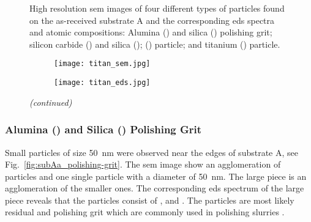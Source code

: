 \begin{figure}
\begin{subfigure}[t]{\textwidth}
          \begin{minipage}[t]{0.11\linewidth}
            \centering
            \atomicTable[&][&][&]
          \end{minipage}
    \end{subfigure}
    \caption[\Ac{sem} images, \ac{eds} spectra, and \ac{eds} atomic compositions of four different types of particles found on as-received substrate A.]{High resolution \ac{sem} images of four different types of particles found on the as-received substrate A and the corresponding \ac{eds} spectra and atomic compositions:  Alumina () and silica () polishing grit;  silicon carbide () and silica ();   () particle; and  titanium () particle.}\label{fig:subAa_sem_w_eds}
\end{figure}

\begin{figure}[htbp]
\ContinuedFloat
    \centering
    \begin{subfigure}[t]{\textwidth}
        \caption{}\label{fig:subAa_titanium-particle}
          \begin{minipage}[t]{0.43\linewidth}
            \centering
            \texttt{[image: titan\_sem.jpg]}
          \end{minipage}
          \hfill
          \begin{minipage}[t]{0.43\linewidth}
            \centering
            \texttt{[image: titan\_eds.jpg]}
          \end{minipage}
          \begin{minipage}[t]{0.11\linewidth}
            \centering
            \atomicTable[&][&][&]
          \end{minipage}
    \end{subfigure}
    \captionsetup{list=no}
    \caption{\emph{(continued)}}
\end{figure}

\subsubsection{Alumina () and Silica () Polishing Grit}
Small particles of size \SI{50}{\nano\metre} were observed near the edges of substrate A, see Fig.~\ref{fig:subAa_polishing-grit}. The \ac{sem} image show an agglomeration of particles and one single particle with a diameter of \SI{50}{\nano\metre}. The large piece is an agglomeration of the smaller ones. The corresponding \ac{eds} spectrum of the large piece reveals that the particles consist of ,  and . The particles are most likely residual  and  polishing grit which are commonly used in polishing slurries \citep{benson2015as-received}. 

